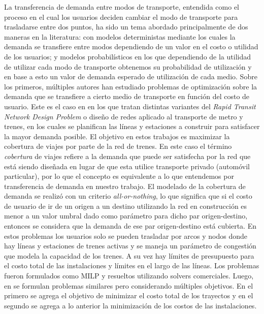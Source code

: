   La transferencia de demanda entre modos de transporte, entendida como el proceso en el cual los usuarios deciden cambiar el modo de transporte para trasladarse entre dos puntos, ha sido un tema abordado principalmente de dos maneras en la literatura: con modelos deterministas mediante los cuales la demanda se transfiere entre modos dependiendo de un valor en el costo o utilidad de los usuarios; y modelos probabilísticos en los que dependiendo de la utilidad de utilizar cada modo de transporte obtenemos su probabilidad de utilización y en base a esto un valor de demanda esperado de utilización de cada medio. Sobre los primeros, múltiples autores han estudiado problemas de optimización sobre la demanda que se transfiere a cierto medio de transporte en función del costo de usuario. Este es el caso en \parencite{garcia2005, laporte2007} en los que tratan distintas variantes del {\it Rapid Transit Network Design Problem} o diseño de redes aplicado al transporte de metro y trenes, en los cuales se planifican las líneas y estaciones a construir para satisfacer la mayor demanda posible. El objetivo en estos trabajos es maximizar la cobertura de viajes por parte de la red de trenes. En este caso el término {\it cobertura} de viajes refiere a la demanda que puede ser satisfecha por la red que está siendo diseñada en lugar de que esta utilice transporte privado (automóvil particular), por lo que el concepto es equivalente a lo que entendemos por transferencia de demanda en nuestro trabajo. El modelado de la cobertura de demanda se realizó con un criterio {\it all-or-nothing}, lo que significa que si el costo de usuario de ir de un origen a un destino utilizando la red en construcción es menor a un valor umbral dado como parámetro para dicho par origen-destino, entonces se considera que la demanda de ese par origen-destino está cubierta. En estos problemas los usuarios solo se pueden trasladar por arcos y nodos donde hay líneas y estaciones de trenes activas y se maneja un parámetro de congestión que modela la capacidad de los trenes. A su vez hay límites de presupuesto para el costo total de las instalaciones y límites en el largo de las líneas. Los problemas fueron formulados como MILP y resueltos utilizando solvers comerciales. Luego, en \parencite{marin2007, cadarso2015} se formulan problemas similares pero considerando múltiples objetivos. En el primero se agrega el objetivo de minimizar el costo total de los trayectos y en el segundo se agrega a lo anterior la minimización de los costos de las instalaciones.

